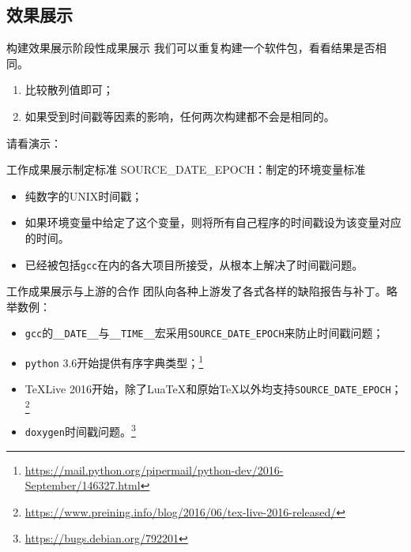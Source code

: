 \documentclass{beamer}
\begin{document}
\subsection{效果展示}
\begin{frame}[t]{构建效果展示}{阶段性成果展示}
我们可以重复构建一个软件包，看看结果是否相同。
\begin{enumerate}
\item 比较散列值即可；
\item 如果受到时间戳等因素的影响，任何两次构建都不会是相同的。
\end{enumerate}
\pause
\vfill

\begin{center}
请看演示：
\end{center}
\end{frame}
\begin{frame}[t]{工作成果展示}{制定标准}
{\Large SOURCE\_DATE\_EPOCH：制定的环境变量标准}

\vspace{1em}
\begin{itemize}
\item 纯数字的UNIX时间戳；
\item 如果环境变量中给定了这个变量，则将所有自己程序的时间戳设为该变量对应的时间。\cite{debian-reproduciblebuilds-sourcedateepoch}
\item 已经被包括\texttt{gcc}在内的各大项目所接受，从根本上解决了时间戳问题。
\end{itemize}
\end{frame}
\begin{frame}[t]{工作成果展示}{与上游的合作}
团队向各种上游发了各式各样的缺陷报告与补丁。略举数例：

\vspace{1em}
\begin{itemize}
\item \texttt{gcc}的\texttt{\_\_DATE\_\_}与\texttt{\_\_TIME\_\_}宏采用\texttt{SOURCE\_DATE\_EPOCH}来防止时间戳问题；
\item \texttt{python} 3.6开始提供有序字典类型；\footnote{\url{https://mail.python.org/pipermail/python-dev/2016-September/146327.html}}
\item \TeX{}Live 2016开始，除了Lua\TeX{}和原始\TeX{}以外均支持\texttt{SOURCE\_DATE\_EPOCH}；\footnote{\url{https://www.preining.info/blog/2016/06/tex-live-2016-released/}}
\item \texttt{doxygen}时间戳问题。\footnote{\url{https://bugs.debian.org/792201}}
\end{itemize}
\end{frame}
\end{document}
